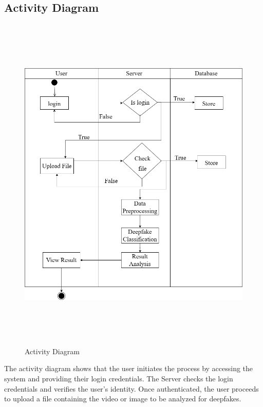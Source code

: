 
\subsection{Activity Diagram}
\begin{figure}[h]
    \centering
    \includegraphics[height=6.5in,width= 6in ]{img/activity diagram.drawio.png}
    \caption{{Activity Diagram}}
\end{figure}
\justify
The activity diagram shows that the user initiates the process by accessing the system and providing their login credentials. The Server checks the login credentials and verifies the user's identity. Once authenticated, the user proceeds to upload a file containing the video or image to be analyzed for deepfakes.

